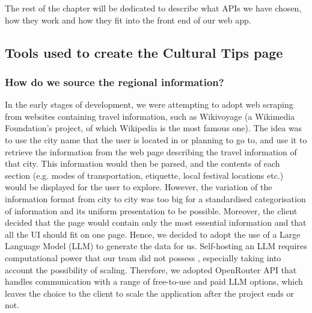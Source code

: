 The rest of the chapter will be dedicated to describe what APIs we have chosen, how they work and how they fit into the front end of our web app. 


\subsection{Tools used to create the Cultural Tips page}

\subsubsection{How do we source the regional information?}

In the early stages of development, we were attempting to adopt web scraping from websites containing travel information, such as Wikivoyage (a Wikimedia Foundation's project, of which Wikipedia is the most famous one). The idea was to use the city name that the user is located in or planning to go to, and use it to retrieve the information from the web page describing the travel information of that city. This information would then be parsed, and the contents of each section (e.g. modes of transportation, etiquette, local festival locations etc.) would be displayed for the user to explore. However, the variation of the information format from city to city was too big for a standardised categorisation of information and its uniform presentation to be possible. Moreover, the client decided that the page would contain only the most essential information and that all the UI should fit on one page. Hence, we decided to adopt the use of a Large Language Model (LLM) to generate the data for us. Self-hosting an LLM requires computational power that our team did not possess \cite{selfHostedLLM}, especially taking into account the possibility of scaling. Therefore, we adopted OpenRouter API that handles communication with a range of free-to-use and paid LLM options, which leaves the choice to the client to scale the application after the project ends or not.  

